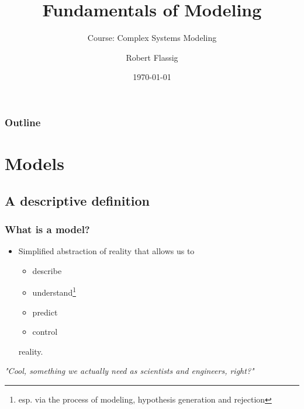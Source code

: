 \documentclass{beamer}
\title{Fundamentals of Modeling}
\subtitle{Course: Complex Systems Modeling}
\author{Robert Flassig}
\institute{Brandenburg University of Applied Sciences}
\date{\today}
\begin{document}
\begin{frame}
\titlepage
\end{frame}

\begin{frame}
\frametitle{Outline}
\tableofcontents
\end{frame}

\section{Models}
\subsection{A descriptive definition}
\begin{frame}
\frametitle{What is a model?}
\begin{itemize}
\item Simplified abstraction of reality that allows us to
\begin{itemize}
\item describe
\item understand\footnote{esp. via the process of modeling, hypothesis generation and rejection}
\item predict
\item control
\end{itemize}
reality.
\end{itemize}
\emph{"Cool, something we actually need as scientists and engineers, right?"}
\end{frame}
%
\end{document}
